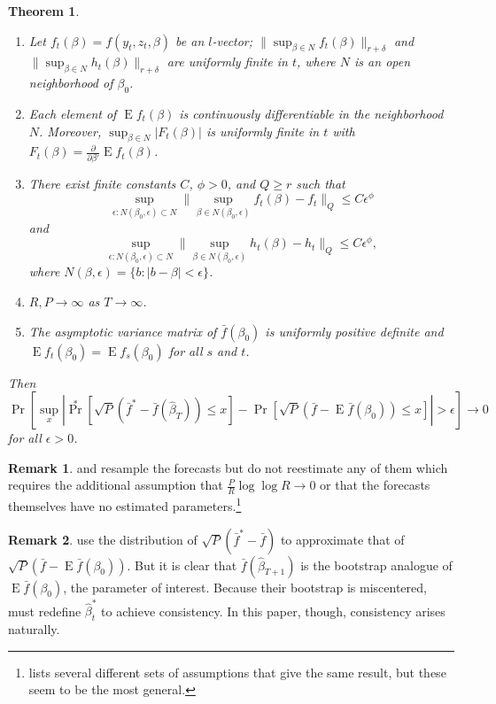 \documentclass[11pt,fleqn]{article}
\newtheorem{thm}{Theorem}
\theoremstyle{definition}
\newtheorem{rem}{Remark}
\DeclareMathOperator{\E}{E}
\DeclareMathOperator{\pr}{Pr}
\newcommand{\dd}[1]{\frac{\partial}{\partial #1}}
\begin{document}
\begin{thm}
\begin{enumerate}
  \item Let $f_{t}(\beta) = f(y_{t}, z_{t}, \beta)$ be an $l$-vector;
    $\| \sup_{\beta \in N} f_{t}(\beta) \|_{r+\delta}$ and $\|
    \sup_{\beta \in N} h_{t}(\beta) \|_{r+\delta}$ are uniformly
    finite in $t$, where $N$ is an open neighborhood of $\beta_{0}$.
  \item Each element of $\E f_{t}(\beta)$ is continuously
    differentiable in the neighborhood $N$.  Moreover, $\sup_{\beta
      \in N} | F_{t}(\beta) |$ is uniformly finite in $t$ with
    $F_{t}(\beta) = \dd{\beta'} \E f_{t}(\beta)$.
  \item There exist finite constants $C$, $\phi > 0$, and $Q \geq r$
    such that \[\sup_{\epsilon : N(\beta_{0}, \epsilon) \subset N}\|
    \sup_{\beta \in N(\beta_{0}, \epsilon)} f_{t}(\beta) - f_{t} \|_Q
    \leq C \epsilon^{\phi}\] and \[\sup_{\epsilon : N(\beta_{0},
      \epsilon) \subset N}\| \sup_{\beta \in N(\beta_{0}, \epsilon)}
    h_{t}(\beta) - h_{t} \|_Q \leq C \epsilon^{\phi},\] where
    $N(\beta, \epsilon) = \{b : |b - \beta| < \epsilon\}$.
  \item $R, P \to \infty$ as $T \to \infty$.
  \item The asymptotic variance matrix of $\bar{f}(\beta_0)$ is
    uniformly positive definite and $\E f_t(\beta_0) = \E
    f_s(\beta_0)$ for all $s$ and $t$.
  \end{enumerate}
  Then
  \begin{equation}
    \pr[\sup_x | \pr^*[\sqrt{P} (\bar{f}^* - \bar{f}(\hat{\beta}_{T}))
        \leq x] - \pr[\sqrt{P}( \bar{f} - \E \bar{f}(\beta_0)) \leq x] | >
      \epsilon] \to 0
  \end{equation}
  for all $\epsilon > 0$.
\end{thm}

\begin{rem}
  \citet{Whi:00} and \citet{Han:05} resample the forecasts but do not
  reestimate any of them which requires the additional assumption that
  $\tfrac{P}{R} \log \log R \to 0$ or that the forecasts themselves
  have no estimated parameters.\footnote{\citet{Whi:00} lists several
    different sets of assumptions that give the same result, but these
    seem to be the most general.}
\end{rem}

\begin{rem}
  \citet{CoS:07} use the distribution of $\sqrt{P}(\bar{f}^{*} -
  \bar{f})$ to approximate that of $\sqrt{P}(\bar{f} - \E
  \bar{f}(\beta_0))$.  But it is clear that
  $\bar{f}(\hat{\beta}_{T+1})$ is the bootstrap analogue of $\E
  \bar{f}(\beta_0)$, the parameter of interest.  Because their
  bootstrap is miscentered, \citet{CoS:07} must redefine
  $\hat{\beta}_t^{*}$ to achieve consistency.  In this paper, though,
  consistency arises naturally.
\end{rem}
\end{document}
